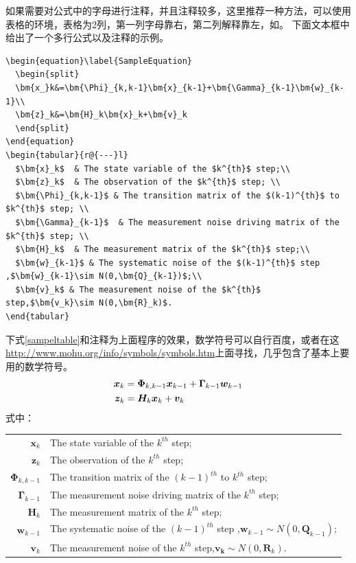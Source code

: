 {\begin{spacing}{1.5}
如果需要对公式中的字母进行注释，并且注释较多，这里推荐一种方法，可以使用表格的环境，表格为2列，第一列字母靠右，第二列解释靠左，如。 
下面文本框中给出了一个多行公式以及注释的示例。
\begin{lstlisting}
\begin{equation}\label{SampleEquation}
  \begin{split}
  \bm{x_}k&=\bm{\Phi}_{k,k-1}\bm{x}_{k-1}+\bm{\Gamma}_{k-1}\bm{w}_{k-1}\\
  \bm{z}_k&=\bm{H}_k\bm{x}_k+\bm{v}_k
  \end{split}
\end{equation}
\begin{tabular}{r@{---}l}
  $\bm{x}_k$  & The state variable of the $k^{th}$ step;\\
  $\bm{z}_k$  & The observation of the $k^{th}$ step; \\
  $\bm{\Phi}_{k,k-1}$ & The transition matrix of the $(k-1)^{th}$ to $k^{th}$ step; \\
  $\bm{\Gamma}_{k-1}$  & The measurement noise driving matrix of the $k^{th}$ step; \\
  $\bm{H}_k$  & The measurement matrix of the $k^{th}$ step;\\
  $\bm{w}_{k-1}$ & The systematic noise of the $(k-1)^{th}$ step ,$\bm{w}_{k-1}\sim N(0,\bm{Q}_{k-1})$;\\
  $\bm{v}_k$ & The measurement noise of the $k^{th}$ step,$\bm{v_k}\sim N(0,\bm{R}_k)$.
\end{tabular}
\end{lstlisting}

下式\ref{sampeltable}和注释为上面程序的效果，数学符号可以自行百度，或者在这\url{http://www.mohu.org/info/symbols/symbols.htm}上面寻找，几乎包含了基本上要用的数学符号。
\begin{equation}\label{SampleEquation}
  \begin{split}
  \bm{x_}k&=\bm{\Phi}_{k,k-1}\bm{x}_{k-1}+\bm{\Gamma}_{k-1}\bm{w}_{k-1}\\
  \bm{z}_k&=\bm{H}_k\bm{x}_k+\bm{v}_k
  \end{split}
\end{equation}
式中：

\begin{tabular}{r@{---}l}
  $\bm{x}_k$  & The state variable of the $k^{th}$ step;\\
  $\bm{z}_k$  & The observation of the $k^{th}$ step; \\
  $\bm{\Phi}_{k,k-1}$ & The transition matrix of the $(k-1)^{th}$ to $k^{th}$ step; \\
  $\bm{\Gamma}_{k-1}$  & The measurement noise driving matrix of the $k^{th}$ step; \\
  $\bm{H}_k$  & The measurement matrix of the $k^{th}$ step;\\
  $\bm{w}_{k-1}$ & The systematic noise of the $(k-1)^{th}$ step ,$\bm{w}_{k-1}\sim N(0,\bm{Q}_{k-1})$;\\
  $\bm{v}_k$ & The measurement noise of the $k^{th}$ step,$\bm{v_k}\sim N(0,\bm{R}_k)$.
\end{tabular}


\end{spacing}}
